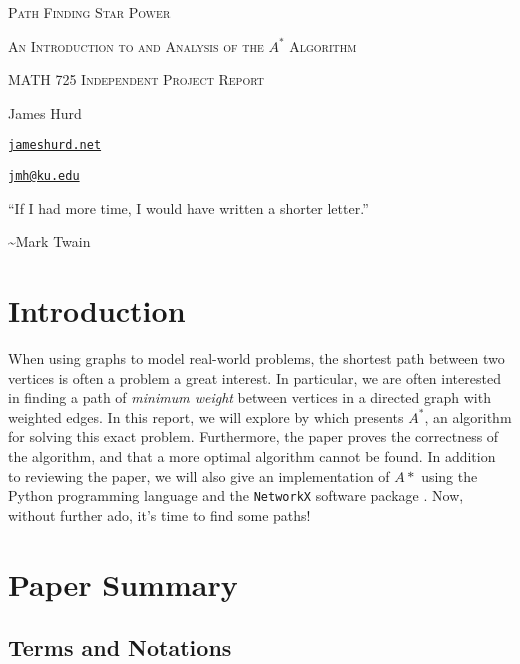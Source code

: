 \documentclass[letterpaper, 10pt]{article}
\theoremstyle{definition}
\theoremstyle{Algorithm}
\begin{document}
{\centering

  {\Huge\scshape Path Finding Star Power }

  {\scshape An Introduction to and Analysis of the $A^*$ Algorithm}

  {\footnotesize\scshape MATH 725 Independent Project Report}


James Hurd

\href{https://jameshurd.net}{\texttt{jameshurd.net}}

\href{mailto:jmh@ku.edu}{\texttt{jmh@ku.edu}}

}

\begin{center}
``If I had more time, I would have written a shorter letter.''

\textasciitilde Mark Twain
\end{center}

\section{Introduction} %
When using graphs to model real-world problems, the shortest path
between two vertices is often a problem a great interest. In
particular, we are often interested in finding a path of 
\emph{minimum weight} between vertices in a directed graph
with weighted edges. In this report, we will explore 
 by \citeauthor{a_star} \cite{a_star}
which presents $A^*$, an algorithm for solving this 
exact problem. Furthermore, the
paper proves the correctness of the algorithm, and that a more 
optimal algorithm cannot be found. In addition to reviewing the
paper, we will also give an implementation of $A*$ using
the Python programming language and the \texttt{NetworkX}
software package
\cite{networkx}. Now, without further ado, it's time to find
some paths!



\section{Paper Summary} %

\subsection{Terms and Notations} %
\end{document}
